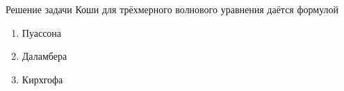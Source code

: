 Решение задачи Коши для трёхмерного волнового уравнения даётся формулой

\begin{enumerate}[label=\arabic*)]
    \item Пуассона
    \item Даламбера
    \item Кирхгофа
\end{enumerate}

